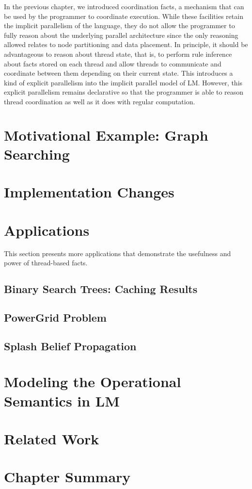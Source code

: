 In the previous chapter, we introduced coordination facts, a mechanism that can
be used by the programmer to coordinate execution. While these facilities retain
the implicit parallelism of the language, they do not allow the programmer to
fully reason about the underlying parallel architecture since the only reasoning
allowed relates to node partitioning and data placement. In principle, it should
be advantageous to reason about thread state, that is, to perform rule inference
about facts stored on each thread and allow threads to communicate and
coordinate between them depending on their current state. This introduces a kind
of explicit parallelism into the implicit parallel model of LM.  However, this
explicit parallelism remains declarative so that the programmer is able to
reason thread coordination as well as it does with regular computation.

\section{Motivational Example: Graph Searching}


\section{Implementation Changes}


\section{Applications}

This section presents more applications that demonstrate the usefulness and
power of thread-based facts.

\subsection{Binary Search Trees: Caching Results}


\subsection{PowerGrid Problem}


\subsection{Splash Belief Propagation}\label{sec:coordination:bp}


\section{Modeling the Operational Semantics in LM}


\section{Related Work}


\section{Chapter Summary}

